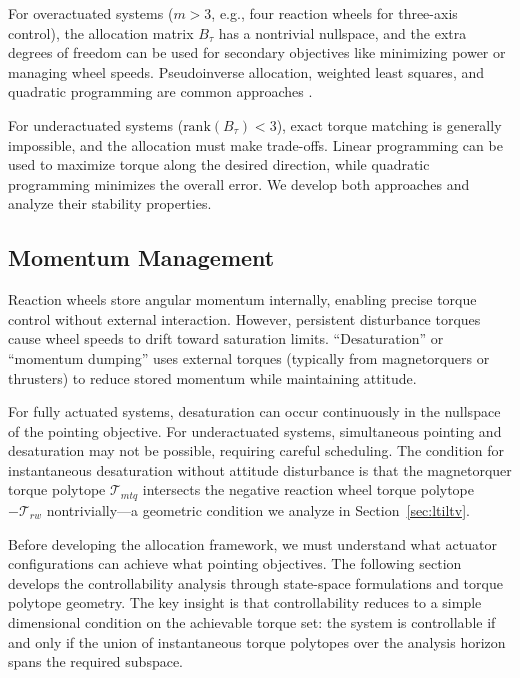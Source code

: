 \documentclass[conference]{IEEEtran}
\begin{document}
For overactuated systems ($m > 3$, e.g., four reaction wheels for three-axis control), the allocation matrix $B_\tau$ has a nontrivial nullspace, and the extra degrees of freedom can be used for secondary objectives like minimizing power or managing wheel speeds. Pseudoinverse allocation, weighted least squares, and quadratic programming are common approaches \cite{johansen_control_2013}.

For underactuated systems ($\text{rank}(B_\tau) < 3$), exact torque matching is generally impossible, and the allocation must make trade-offs. Linear programming can be used to maximize torque along the desired direction, while quadratic programming minimizes the overall error. We develop both approaches and analyze their stability properties.

\subsection{Momentum Management}
Reaction wheels store angular momentum internally, enabling precise torque control without external interaction. However, persistent disturbance torques cause wheel speeds to drift toward saturation limits. ``Desaturation'' or ``momentum dumping'' uses external torques (typically from magnetorquers or thrusters) to reduce stored momentum while maintaining attitude.

For fully actuated systems, desaturation can occur continuously in the nullspace of the pointing objective. For underactuated systems, simultaneous pointing and desaturation may not be possible, requiring careful scheduling. The condition for instantaneous desaturation without attitude disturbance is that the magnetorquer torque polytope $\mathcal{T}_{mtq}$ intersects the negative reaction wheel torque polytope $-\mathcal{T}_{rw}$ nontrivially---a geometric condition we analyze in Section~\ref{sec:ltiltv}.


Before developing the allocation framework, we must understand what actuator configurations can achieve what pointing objectives. The following section develops the controllability analysis through state-space formulations and torque polytope geometry. The key insight is that controllability reduces to a simple dimensional condition on the achievable torque set: the system is controllable if and only if the union of instantaneous torque polytopes over the analysis horizon spans the required subspace.
\end{document}
